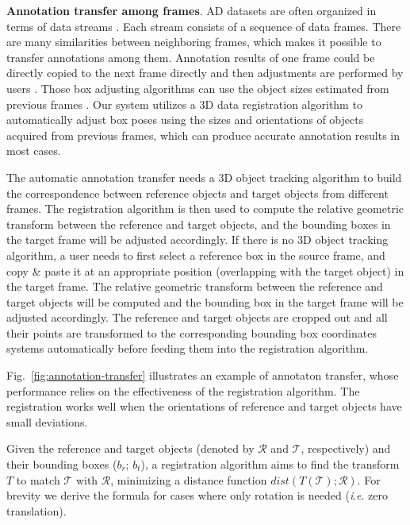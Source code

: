 \documentclass[letterpaper, 10 pt, conference]{ieeeconf}  %
\begin{document}
\textbf{Annotation transfer among frames}. 
AD datasets are often organized in terms of data streams \cite{Caesar2019nuScenesAM,Patil2019TheHD,lyft2019}. Each stream consists of a sequence of data frames. 
There are many similarities between neighboring frames, which makes it possible to transfer annotations among them. 
Annotation results of one frame could be directly copied to the next frame directly and then adjustments are performed by users \cite{Zimmer20193DBA}.
Those box adjusting algorithms can use the object sizes estimated from previous frames \cite{Wang2019LATTEAL}. 
Our system utilizes a 3D data registration algorithm \cite{Yang2016GoICPAG} to automatically adjust box poses using the sizes and orientations of objects acquired from previous frames,
which can produce accurate annotation results in most cases.

The automatic annotation transfer needs a 3D object tracking algorithm to build the correspondence between reference objects and target objects from different frames. 
The registration algorithm is then used to compute the relative geometric transform between the reference and target objects, 
and the bounding boxes in the target frame will be adjusted accordingly.
If there is no 3D object tracking algorithm, a user needs to first select a reference box in the source frame, and copy \& paste it at an appropriate position (overlapping with the target object) in the target frame. 
The relative geometric transform between the reference and target objects will be computed and the bounding box in the target frame will be adjusted accordingly.
The reference and target objects are cropped out and all their points are transformed to the corresponding bounding box coordinates systems automatically
before feeding them into the registration algorithm.

Fig.~\ref{fig:annotation-transfer} illustrates an example of annotaton transfer, whose performance relies on the effectiveness of the registration algorithm. 
The registration works well when the orientations of reference and target objects have small deviations.

Given the reference and target objects (denoted by $\mathcal{R}$ and $\mathcal{T}$, respectively) and their bounding boxes ($b_r$; $b_t$), a registration algorithm aims to find the transform $T$ to match $\mathcal{T}$ with $\mathcal{R}$, minimizing a distance function $dist(T(\mathcal{T}); \mathcal{R} )$. For brevity we derive the formula for cases where only rotation is needed (\textit{i}.\textit{e}. zero translation).
\end{document}

